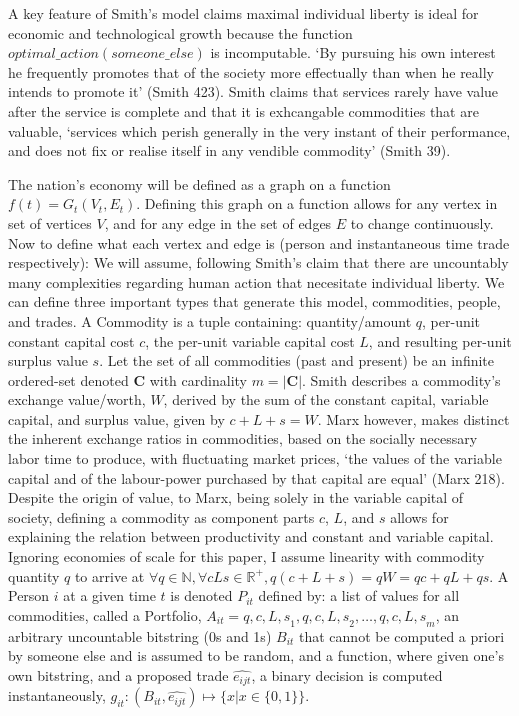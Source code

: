 \documentclass[12pt]{article}
\begin{document}
A key feature of Smith's model claims maximal individual liberty is ideal for economic and technological growth because the function $optimal\_action(someone\_else)$ is incomputable.
`By pursuing his own interest he frequently promotes that of the society more effectually than when he really intends to promote it' (Smith 423).
Smith claims that services rarely have value after the service is complete and that it is exhcangable commodities that are valuable, `services which perish generally in the very instant of their performance, and does not fix or realise itself in any vendible commodity' (Smith 39). \par

The nation's economy will be defined as a graph on a function $f(t) = G_t(V_t, E_t)$. 
Defining this graph on a function allows for any vertex in set of vertices $V$, and for any edge in the set of edges $E$ to change continuously.
Now to define what each vertex and edge is (person and instantaneous time trade respectively): We will assume, following Smith's claim that there are uncountably many complexities regarding human action that necesitate individual liberty. 
We can define three important types that generate this model, commodities, people, and trades.
A Commodity is a tuple containing: quantity/amount $q$, per-unit constant capital cost $c$, the per-unit variable capital cost $L$, and resulting per-unit surplus value $s$. 
Let the set of all commodities (past and present) be an infinite ordered-set denoted $\boldsymbol{C}$ with cardinality $m = |\boldsymbol{C}|$.
Smith describes a commodity's exchange value/worth, $W$, derived by the sum of the constant capital, variable capital, and surplus value, given by $c + L + s = W$. 
Marx however, makes distinct the inherent exchange ratios in commodities, based on the socially necessary labor time to produce, with fluctuating market prices, `the values of the variable capital and of the labour-power purchased by that capital are equal' (Marx 218).
Despite the origin of value, to Marx, being solely in the variable capital of society, defining a commodity as component parts $c$, $L$, and $s$ allows for explaining the relation between productivity and constant and variable capital.
Ignoring economies of scale for this paper, I assume linearity with commodity quantity $q$ to arrive at $\forall q \in \mathbb{N}, \forall{cLs} \in \mathbb{R^{+}}, q(c + L + s) = qW = qc + qL + qs $.
A Person $i$ at a given time $t$ is denoted $P_{it}$ defined by: a list of values for all commodities, called a Portfolio, $A_{it} = {{q, c, L, s}_{1}, {q, c, L, s}_{2},\ldots,{q, c, L, s}_{m}}$, an arbitrary uncountable bitstring (0s and 1s) $B_{it}$ that cannot be computed a priori by someone else and is assumed to be random, and a function, where given one's own bitstring, and a proposed trade $\hat{e_{ijt}}$, a binary decision is computed instantaneously, $g_{it} : (B_{it}, \hat{e_{ijt}}) \mapsto \{x | x \in  \{0, 1\}\}$. 
\end{document}

